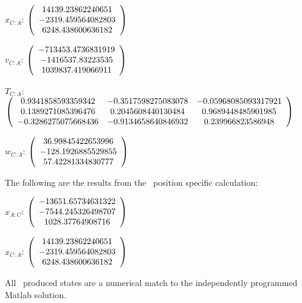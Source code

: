 \begin{description}
$x_{C:A}$: $\left( \begin{array} {ccc}  14139.23862240651 \\    -2319.459564082803 \\     6248.438600636182
\end{array} \right)\\ \\$

$v_{C:A}$:  $\left( \begin{array} {ccc}  -713453.4736831919 \\     -1416537.83223535 \\     1039837.419066911
\end{array} \right)\\ \\$

$T_{C:A}$: $\left( \begin{array} {ccc}
 0.9341858593359342 &   -0.3517598275083078 &  -0.05968085093317921 \\
  0.1389271085396476 &    0.2045608440130484 &    0.9689448485901985 \\
  -0.3286275075668436 &   -0.9134658640846932 &     0.239966823586948 \\
\end{array} \right)\\ \\$

$w_{C:A}$:  $\left( \begin{array} {ccc} 36.99845422653996 \\    -128.1926885529855 \\     57.42281334830777
\end{array} \right)\\ \\$

The following are the results from the \ position specific calculation:

$x_{A:C}$: $\left( \begin{array} {ccc} -13651.65734631322 \\    -7544.245326498707 \\      1028.37764908716
\end{array} \right)\\ \\$

$x_{C:A}$: $\left( \begin{array} {ccc}  14139.23862240651 \\    -2319.459564082803 \\     6248.438600636182
\end{array} \right)\\ \\$

All \ produced states are a numerical match to the independently programmed Matlab solution.
\end{description}

